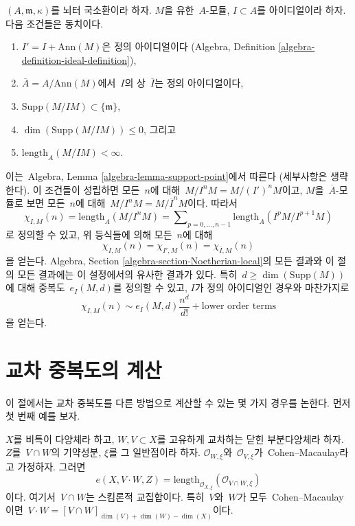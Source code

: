 \begin{remark}
\label{remark-trivial-generalization}
$(A, \mathfrak m, \kappa)$를 뇌터 국소환이라 하자.
$M$을 유한\  $A$-모듈, $I \subset A$를 아이디얼이라 하자.
다음 조건들은 동치이다.
\begin{enumerate}
\item $I' = I + \text{Ann}(M)$은 정의 아이디얼이다
(Algebra, Definition \ref{algebra-definition-ideal-definition}),
\item $\overline{A} = A/\text{Ann}(M)$에서\  $I$의 상\ 
$\overline{I}$는 정의 아이디얼이다,
\item $\text{Supp}(M/IM) \subset \{\mathfrak m\}$,
\item $\dim(\text{Supp}(M/IM)) \leq 0$, 그리고
\item $\text{length}_A(M/IM) < \infty$.
\end{enumerate}
이는\  Algebra, Lemma \ref{algebra-lemma-support-point}에서 따른다
(세부사항은 생략한다). 이 조건들이 성립하면 모든\  $n$에 대해\ 
$M/I^nM = M/(I')^nM$이고, $M$을\  $\overline{A}$-모듈로 보면 모든\ 
$n$에 대해\  $M/I^nM = M/\overline{I}^nM$이다.
따라서
$$
\chi_{I, M}(n) = \text{length}_A(M/I^nM) =
\sum\nolimits_{p = 0, \ldots, n - 1} \text{length}_A(I^pM/I^{p + 1}M)
$$
로 정의할 수 있고, 위 등식들에 의해 모든\  $n$에 대해
$$
\chi_{I, M}(n) = \chi_{I', M}(n) = \chi_{\overline{I}, M}(n)
$$
을 얻는다.
Algebra, Section \ref{algebra-section-Noetherian-local}의 모든 결과와
이 절의 모든 결과에는 이 설정에서의 유사한 결과가 있다.
특히\  $d \geq \dim(\text{Supp}(M))$에 대해 중복도\  $e_I(M, d)$를 정의할
수 있고, $I$가 정의 아이디얼인 경우와 마찬가지로
$$
\chi_{I, M}(n) \sim e_I(M, d) \frac{n^d}{d!} + \text{lower order terms}
$$
을 얻는다.
\end{remark}



\section{교차 중복도의 계산}
\label{section-computing-intersection-multiplicities}

\noindent
이 절에서는 교차 중복도를 다른 방법으로 계산할 수 있는 몇 가지 경우를
논한다. 먼저 첫 번째 예를 보자.

\begin{lemma}
\label{lemma-intersection-multiplicity-CM}
$X$를 비특이 다양체라 하고, $W, V \subset X$를 고유하게 교차하는 닫힌
부분다양체라 하자. $Z$를\  $V \cap W$의 기약성분, $\xi$를 그 일반점이라 하자.
$\mathcal{O}_{W, \xi}$와\  $\mathcal{O}_{V, \xi}$가\  Cohen--Macaulay라고
가정하자. 그러면
$$
e(X, V \cdot W, Z) =
\text{length}_{\mathcal{O}_{X, \xi}}(\mathcal{O}_{V \cap W, \xi})
$$
이다. 여기서\  $V \cap W$는 스킴론적 교집합이다.
특히\  $V$와\  $W$가 모두\  Cohen--Macaulay이면\ 
$V \cdot W = [V \cap W]_{\dim(V) + \dim(W) - \dim(X)}$이다.
\end{lemma}

